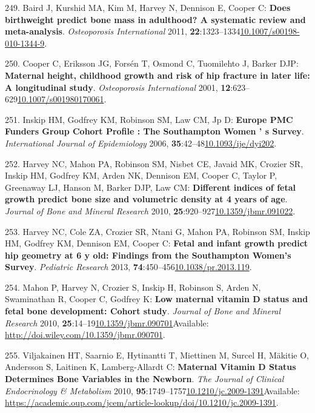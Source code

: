 \documentclass[
]{book}
\begin{document}
\leavevmode\hypertarget{ref-Baird2011}{}%
249. Baird J, Kurshid MA, Kim M, Harvey N, Dennison E, Cooper C: \textbf{Does birthweight predict bone mass in adulthood? A systematic review and meta-analysis}. \emph{Osteoporosis International} 2011, \textbf{22}:1323--1334\href{https://doi.org/10.1007/s00198-010-1344-9}{10.1007/s00198-010-1344-9}.

\leavevmode\hypertarget{ref-Cooper2001}{}%
250. Cooper C, Eriksson JG, Forsén T, Osmond C, Tuomilehto J, Barker DJP: \textbf{Maternal height, childhood growth and risk of hip fracture in later life: A longitudinal study}. \emph{Osteoporosis International} 2001, \textbf{12}:623--629\href{https://doi.org/10.1007/s001980170061}{10.1007/s001980170061}.

\leavevmode\hypertarget{ref-Inskip2006}{}%
251. Inskip HM, Godfrey KM, Robinson SM, Law CM, Jp D: \textbf{Europe PMC Funders Group Cohort Profile : The Southampton Women ' s Survey}. \emph{International Journal of Epidemiology} 2006, \textbf{35}:42--48\href{https://doi.org/10.1093/ije/dyi202}{10.1093/ije/dyi202}.

\leavevmode\hypertarget{ref-Harvey2010a}{}%
252. Harvey NC, Mahon PA, Robinson SM, Nisbet CE, Javaid MK, Crozier SR, Inskip HM, Godfrey KM, Arden NK, Dennison EM, Cooper C, Taylor P, Greenaway LJ, Hanson M, Barker DJP, Law CM: \textbf{Different indices of fetal growth predict bone size and volumetric density at 4 years of age}. \emph{Journal of Bone and Mineral Research} 2010, \textbf{25}:920--927\href{https://doi.org/10.1359/jbmr.091022}{10.1359/jbmr.091022}.

\leavevmode\hypertarget{ref-Harvey2013}{}%
253. Harvey NC, Cole ZA, Crozier SR, Ntani G, Mahon PA, Robinson SM, Inskip HM, Godfrey KM, Dennison EM, Cooper C: \textbf{Fetal and infant growth predict hip geometry at 6 y old: Findings from the Southampton Women's Survey}. \emph{Pediatric Research} 2013, \textbf{74}:450--456\href{https://doi.org/10.1038/pr.2013.119}{10.1038/pr.2013.119}.

\leavevmode\hypertarget{ref-Mahon2010a}{}%
254. Mahon P, Harvey N, Crozier S, Inskip H, Robinson S, Arden N, Swaminathan R, Cooper C, Godfrey K: \textbf{Low maternal vitamin D status and fetal bone development: Cohort study}. \emph{Journal of Bone and Mineral Research} 2010, \textbf{25}:14--19\href{https://doi.org/10.1359/jbmr.090701}{10.1359/jbmr.090701}Available: \url{http://doi.wiley.com/10.1359/jbmr.090701}.

\leavevmode\hypertarget{ref-Viljakainen2010}{}%
255. Viljakainen HT, Saarnio E, Hytinantti T, Miettinen M, Surcel H, Mäkitie O, Andersson S, Laitinen K, Lamberg-Allardt C: \textbf{Maternal Vitamin D Status Determines Bone Variables in the Newborn}. \emph{The Journal of Clinical Endocrinology \& Metabolism} 2010, \textbf{95}:1749--1757\href{https://doi.org/10.1210/jc.2009-1391}{10.1210/jc.2009-1391}Available: \url{https://academic.oup.com/jcem/article-lookup/doi/10.1210/jc.2009-1391}.
\end{document}
